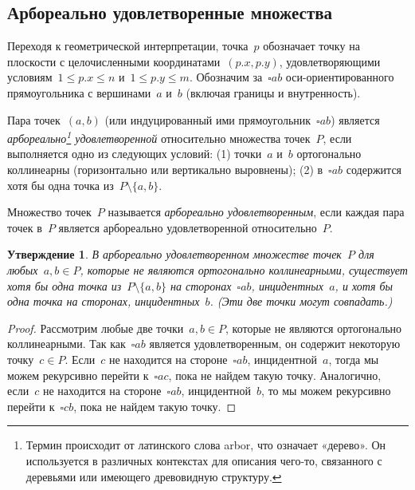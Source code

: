 \documentclass[a4paper,11pt]{article}
\newtheorem{statement}{Утверждение}
\begin{document}
\subsection{Арбореально удовлетворенные множества} 
Переходя к геометрической интерпретации, точка~$p$ обозначает точку на плоскости с целочисленными координатами~$(p.x, p.y)$, удовлетворяющими условиям~$1 \leq p.x \leq n$ и~$1 \leq p.y \leq m$. Обозначим за~$\square ab$ оси-ориентированного прямоугольника с вершинами~$a$ и~$b$ (включая границы и внутренность).

\begin{definition}
Пара точек~$(a, b)$ (или индуцированный ими прямоугольник~$\square ab$) является \emph{арбореально\footnote{Термин происходит от латинского слова arbor, что означает «дерево». Он используется в различных контекстах для описания чего-то, связанного с деревьями или имеющего древовидную структуру.} удовлетворенной} относительно множества точек~$P$, если выполняется одно из следующих условий: 
(1) точки~$a$ и~$b$ ортогонально коллинеарны (горизонтально или вертикально выровнены); 
(2) в~$\square ab$ содержится хотя бы одна точка из~$P \setminus \{a, b\}$. 
\end{definition}
\begin{definition}
Множество точек~$P$ называется \emph{арбореально удовлетворенным}, если каждая пара точек в~$P$ является арбореально удовлетворенной относительно~$P$.
\end{definition}

\begin{statement} \label{obs:arb_satisfaction}
\textit{В арбореально удовлетворенном множестве точек~$P$ для любых~$a, b \in P$, которые не являются ортогонально коллинеарными, существует хотя бы одна точка из~$P \setminus \{a, b\}$ на сторонах~$\square ab$, инцидентных~$a$, и хотя бы одна точка на сторонах, инцидентных~$b$. (Эти две точки могут совпадать.)}
\end{statement}

\begin{proof}
Рассмотрим любые две точки~$a, b \in P$, которые не являются ортогонально коллинеарными. Так как~$\square ab$ является удовлетворенным, он содержит некоторую точку~$c \in P$. Если~$c$ не находится на стороне~$\square ab$, инцидентной~$a$, тогда мы можем рекурсивно перейти к~$\square ac$, пока не найдем такую точку. Аналогично, если~$c$ не находится на стороне~$\square ab$, инцидентной~$b$, то мы можем рекурсивно перейти к~$\square cb$, пока не найдем такую точку.
\end{proof}
\end{document}
